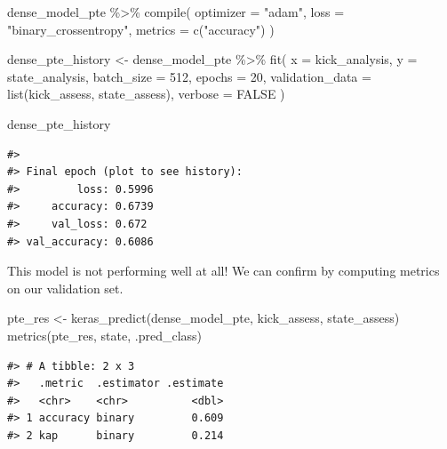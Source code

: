 \documentclass[
]{krantz}
\makeatletter
\newenvironment{Shaded}{\begin{snugshade}}{\end{snugshade}}
\newcommand{\AttributeTok}[1]{\textcolor[rgb]{0.77,0.63,0.00}{#1}}
\newcommand{\ConstantTok}[1]{\textcolor[rgb]{0.00,0.00,0.00}{#1}}
\newcommand{\DecValTok}[1]{\textcolor[rgb]{0.00,0.00,0.81}{#1}}
\newcommand{\FunctionTok}[1]{\textcolor[rgb]{0.00,0.00,0.00}{#1}}
\newcommand{\NormalTok}[1]{#1}
\newcommand{\OtherTok}[1]{\textcolor[rgb]{0.56,0.35,0.01}{#1}}
\newcommand{\SpecialCharTok}[1]{\textcolor[rgb]{0.00,0.00,0.00}{#1}}
\newcommand{\StringTok}[1]{\textcolor[rgb]{0.31,0.60,0.02}{#1}}
\newenvironment{kframe}{%
\medskip{}
\setlength{\fboxsep}{.8em}
 \def\at@end@of@kframe{}%
 \ifinner\ifhmode%
  \def\at@end@of@kframe{\end{minipage}}%
  \begin{minipage}{\columnwidth}%
 \fi\fi%
 \def\FrameCommand##1{\hskip\@totalleftmargin \hskip-\fboxsep
 \colorbox{shadecolor}{##1}\hskip-\fboxsep
     \hskip-\linewidth \hskip-\@totalleftmargin \hskip\columnwidth}%
 \MakeFramed {\advance\hsize-\width
   \@totalleftmargin\z@ \linewidth\hsize
   \@setminipage}}%
 {\par\unskip\endMakeFramed%
 \at@end@of@kframe}
\renewenvironment{Shaded}{\begin{kframe}}{\end{kframe}}
\makeatother
\begin{document}
\begin{Shaded}
\begin{Highlighting}[]
\NormalTok{dense\_model\_pte }\SpecialCharTok{\%\textgreater{}\%} \FunctionTok{compile}\NormalTok{(}
  \AttributeTok{optimizer =} \StringTok{"adam"}\NormalTok{,}
  \AttributeTok{loss =} \StringTok{"binary\_crossentropy"}\NormalTok{,}
  \AttributeTok{metrics =} \FunctionTok{c}\NormalTok{(}\StringTok{"accuracy"}\NormalTok{)}
\NormalTok{)}

\NormalTok{dense\_pte\_history }\OtherTok{\textless{}{-}}\NormalTok{ dense\_model\_pte }\SpecialCharTok{\%\textgreater{}\%}
  \FunctionTok{fit}\NormalTok{(}
    \AttributeTok{x =}\NormalTok{ kick\_analysis,}
    \AttributeTok{y =}\NormalTok{ state\_analysis,}
    \AttributeTok{batch\_size =} \DecValTok{512}\NormalTok{,}
    \AttributeTok{epochs =} \DecValTok{20}\NormalTok{,}
    \AttributeTok{validation\_data =} \FunctionTok{list}\NormalTok{(kick\_assess, state\_assess),}
    \AttributeTok{verbose =} \ConstantTok{FALSE}
\NormalTok{  )}

\NormalTok{dense\_pte\_history}
\end{Highlighting}
\end{Shaded}

\begin{verbatim}
#> 
#> Final epoch (plot to see history):
#>         loss: 0.5996
#>     accuracy: 0.6739
#>     val_loss: 0.672
#> val_accuracy: 0.6086
\end{verbatim}

This model is not performing well at all! We can confirm by computing metrics on our validation set.

\begin{Shaded}
\begin{Highlighting}[]
\NormalTok{pte\_res }\OtherTok{\textless{}{-}} \FunctionTok{keras\_predict}\NormalTok{(dense\_model\_pte, kick\_assess, state\_assess)}
\FunctionTok{metrics}\NormalTok{(pte\_res, state, .pred\_class)}
\end{Highlighting}
\end{Shaded}

\begin{verbatim}
#> # A tibble: 2 x 3
#>   .metric  .estimator .estimate
#>   <chr>    <chr>          <dbl>
#> 1 accuracy binary         0.609
#> 2 kap      binary         0.214
\end{verbatim}
\end{document}
